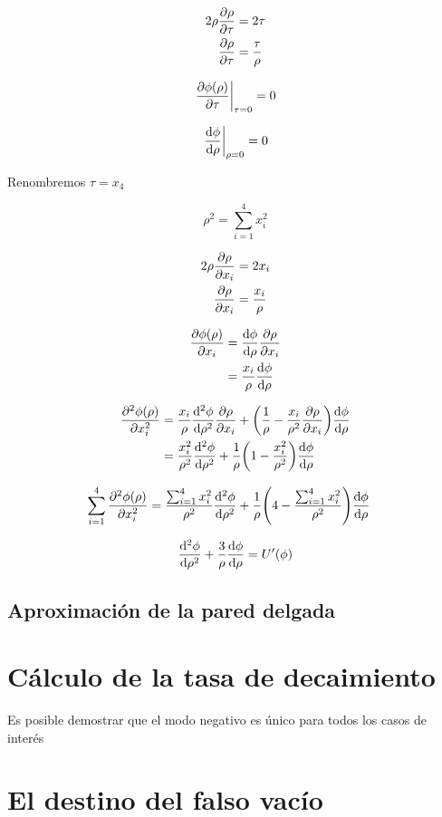 \begin{align}
	2\rho \pdv{\rho}{\tau} &= 2\tau \\
	\pdv{\rho}{\tau} &= \frac{\tau}{\rho}
\end{align}

\begin{equation}
\eval{\pdv{\phi\qty(\rho)}{\tau}}_{\tau = 0} = 0
\end{equation}

\begin{equation}
\eval{\dv{\phi}{\rho}}_{\rho = 0} = 0
\end{equation}

Renombremos $\tau = x_4$

\begin{equation}
	\rho^2 = \sum_{i = 1}^{4} x_i^2
\end{equation}

\begin{align}
2\rho \pdv{\rho}{x_i} &= 2x_i \\
\pdv{\rho}{x_i} &= \frac{x_i}{\rho}
\end{align}

\begin{align}
\pdv{\phi\qty(\rho)}{x_i} &= \dv{\phi}{\rho}\pdv{\rho}{x_i} \\
&= \frac{x_i}{\rho}\dv{\phi}{\rho}
\end{align}

\begin{align}
	\pdv[2]{\phi\qty(\rho)}{x_i} &= \frac{x_i}{\rho}\dv[2]{\phi}{\rho}\pdv{\rho}{x_i} + \qty(\frac{1}{\rho} - \frac{x_i}{\rho^2}\pdv{\rho}{x_i})\dv{\phi}{\rho} \\
	&= \frac{x_i^2}{\rho^2}\dv[2]{\phi}{\rho} + \frac{1}{\rho}\qty(1 - \frac{x_i^2}{\rho^2})\dv{\phi}{\rho} 
\end{align}

\begin{align}
\sum_{i = 1}^{4} \pdv[2]{\phi\qty(\rho)}{x_i} &=  \frac{\sum_{i = 1}^{4} x_i^2}{\rho^2}\dv[2]{\phi}{\rho} + \frac{1}{\rho}\qty(4 - \frac{\sum_{i = 1}^{4} x_i^2}{\rho^2})\dv{\phi}{\rho} 
\end{align}

\begin{equation}
	\dv[2]{\phi}{\rho} + \frac{3}{\rho}\dv{\phi}{\rho} = U'\qty(\phi)
\end{equation}

\subsection{Aproximación de la pared delgada}

\section{Cálculo de la tasa de decaimiento}

Es posible demostrar que el modo negativo es único para todos los casos de interés \cite{coleman1977fate, coleman1988quantum}

\section{El destino del falso vacío}

